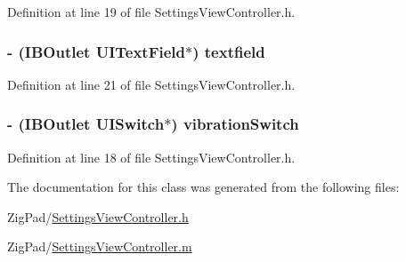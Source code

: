 Definition at line 19 of file SettingsViewController.h.

\hypertarget{interface_settings_view_controller_afada4229afbd422ca57cea7d75b370da}{
\subsubsection[{textfield}]{\setlength{\rightskip}{0pt plus 5cm}-\/ (IBOutlet UITextField$\ast$) textfield}}
\label{interface_settings_view_controller_afada4229afbd422ca57cea7d75b370da}


Definition at line 21 of file SettingsViewController.h.

\hypertarget{interface_settings_view_controller_ae13abd3540c06666a06dd34db7f87cae}{
\subsubsection[{vibrationSwitch}]{\setlength{\rightskip}{0pt plus 5cm}-\/ (IBOutlet UISwitch$\ast$) vibrationSwitch}}
\label{interface_settings_view_controller_ae13abd3540c06666a06dd34db7f87cae}


Definition at line 18 of file SettingsViewController.h.



The documentation for this class was generated from the following files:\begin{DoxyCompactItemize}
\item 
ZigPad/\hyperlink{_settings_view_controller_8h}{SettingsViewController.h}\item 
ZigPad/\hyperlink{_settings_view_controller_8m}{SettingsViewController.m}\end{DoxyCompactItemize}

